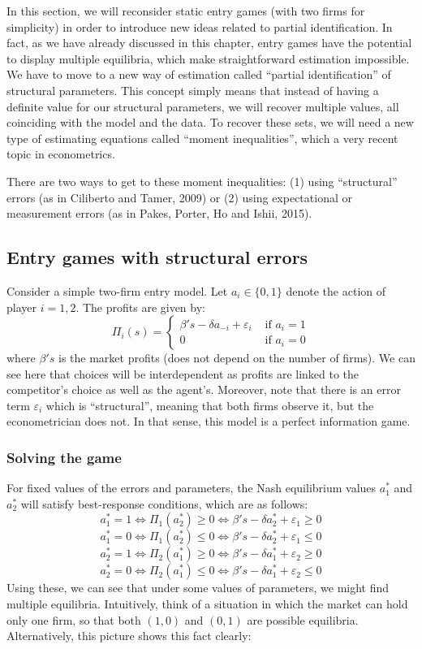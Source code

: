 In this section, we will reconsider static entry games (with two firms for simplicity) in order to introduce new ideas related to partial identification. In fact, as we have already discussed in this chapter, entry games have the potential to display multiple equilibria, which make straightforward estimation impossible. We have to move to a new way of estimation called ``partial identification'' of structural parameters. This concept simply means that instead of having a definite value for our structural parameters, we will recover multiple values, all coinciding with the model and the data. To recover these sets, we will need a new type of estimating equations called ``moment inequalities'', which a very recent topic in econometrics.

There are two ways to get to these moment inequalities: (1) using ``structural'' errors (as in Ciliberto and Tamer, 2009) or (2) using expectational or measurement errors (as in Pakes, Porter, Ho and Ishii, 2015).

\subsection{Entry games with structural errors}

Consider a simple two-firm entry model. Let $a_i \in \{0, 1\}$ denote the action of player $i = 1, 2$.  The profits are given by: $$ \Pi_i(s) = \begin{cases} \beta' s - \delta a_{-i} + \varepsilon_i & \text{ if } a_i = 1 \\
0 & \text{ if } a_i = 0 \end{cases} $$ where $\beta' s$ is the market profits (does not depend on the number of firms). We can see here that choices will be interdependent as profits are linked to the competitor's choice as well as the agent's. Moreover, note that there is an error term $\varepsilon_i$ which is ``structural'', meaning that both firms observe it, but the econometrician does not. In that sense, this model is a perfect information game.

\subsubsection{Solving the game}

For fixed values of the errors and parameters, the Nash equilibrium values $a_1^*$ and $a_2^*$ will satisfy best-response conditions, which are as follows: $$ a_1^* = 1 \Leftrightarrow \Pi_1 (a_2^*) \geq 0 \Leftrightarrow \beta's - \delta a_2^* + \varepsilon_1 \geq 0 $$
$$ a_1^* = 0 \Leftrightarrow \Pi_1 (a_2^*) \leq 0 \Leftrightarrow \beta's - \delta a_2^* + \varepsilon_1 \leq 0 $$
$$ a_2^* = 1 \Leftrightarrow \Pi_2 (a_1^*) \geq 0 \Leftrightarrow \beta's - \delta a_1^* + \varepsilon_2 \geq 0 $$
$$ a_2^* = 0 \Leftrightarrow \Pi_2 (a_1^*) \leq 0 \Leftrightarrow \beta's - \delta a_1^* + \varepsilon_2 \leq 0 $$
Using these, we can see that under some values of parameters, we might find multiple equilibria. Intuitively, think of a situation in which the market can hold only one firm, so that both $(1, 0)$ and $(0, 1)$ are possible equilibria. Alternatively, this picture shows this fact clearly:

